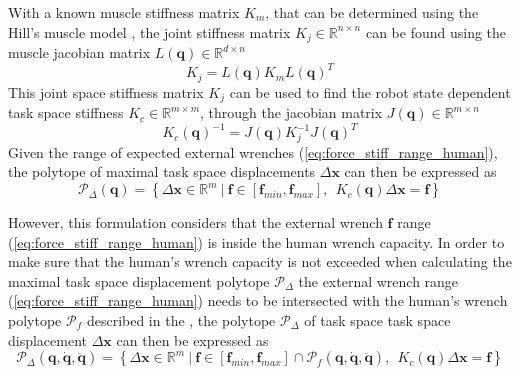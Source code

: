 With a known muscle stiffness matrix $K_m$, that can be determined using the Hill's muscle model \cite{LATASH1993653}, the joint stiffness matrix $K_j\in \mathbb{R}^{n\times n}$ can be found using the muscle jacobian matrix $L(\bm{q}) \in \mathbb{R}^{d\times n}$
\begin{equation}
    K_j = L(\bm{q}) K_m L(\bm{q})^T 
\end{equation}
This joint space stiffness matrix $K_j$ can be used to find the robot state dependent task space stiffness $K_c  \in \mathbb{R}^{m\times m}$, through the jacobian matrix $J(\bm{q})\in\mathbb{R}^{m\times n}$  \cite{Salisbury1980,Ajoudani2018,Inouye2016}
\begin{equation}
     K_c(\bm{q})^{-1} = J(\bm{q}) K_j^{-1}J(\bm{q})^T
\end{equation}
Given the range of expected external wrenches (\ref{eq:force_stiff_range_human}), the polytope of maximal task space displacements $\Delta\bm{x}$ can then be expressed as
\begin{equation}
    \mathcal{P}_\Delta(\bm{q}) = \left\{ \Delta\bm{x} \in \mathbb{R}^m ~|~ \bm{f}\in\left[\bm{f}_{min}, \bm{f}_{max} \right], ~~ K_c(\bm{q})\Delta\bm{x} = \bm{f} \right\}
    \label{eq:stiffness_human_simple}
\end{equation}


However, this formulation considers that the external wrench $\bm{f}$ range (\ref{eq:force_stiff_range_human}) is inside the human wrench capacity. In order to make sure that the human's wrench capacity is not exceeded when calculating the maximal task space displacement polytope $\mathcal{P}_\Delta$ the external wrench range (\ref{eq:force_stiff_range_human}) needs to be intersected with the human's wrench polytope  $\mathcal{P}_f$ described in the , the polytope $\mathcal{P}_\Delta$ of task space task space displacement $\Delta \bm{x}$ can then be expressed as
\begin{equation}
    \mathcal{P}_\Delta(\bm{q},\dot{\bm{q}},\ddot{\bm{q}}) = \left\{ \Delta\bm{x} \in \mathbb{R}^m ~|~ \bm{f}\in \left[\bm{f}_{min}, \bm{f}_{max} \right] \cap \mathcal{P}_f(\bm{q},\dot{\bm{q}},\ddot{\bm{q}}),  ~~ \! K_c(\bm{q})\Delta\bm{x}=\bm{f}\right\}
\end{equation}

